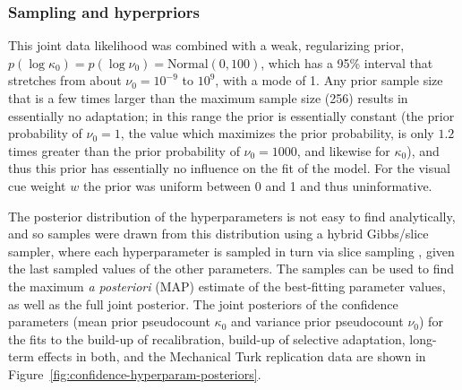 \subsubsection{Sampling and hyperpriors}
\label{sec:sampl-hyperp-priors}

This joint data likelihood was combined with a weak, regularizing prior, $p(\log \kappa_0) = p(\log \nu_0) = \mathrm{Normal}(0, 100)$, which has a 95\% interval that stretches from about $\nu_0=10^{-9}$ to $10^{9}$, with a mode of 1.  Any prior sample size that is a few times larger than the maximum sample size (256) results in essentially no adaptation; in this range the prior is essentially constant (the prior probability of $\nu_0 = 1$, the value which maximizes the prior probability, is only $1.2$ times greater than the prior probability of $\nu_0=1000$, and likewise for $\kappa_0$), and thus this prior has essentially no influence on the fit of the model.  For the visual cue weight $w$ the prior was uniform between 0 and 1 and thus uninformative.

The posterior distribution of the hyperparameters is not easy to find analytically, and so samples were drawn from this distribution using a hybrid Gibbs/slice sampler, where each hyperparameter is sampled in turn via slice sampling \autocite{Neal2003}, given the last sampled values of the other parameters.  The samples can be used to find the maximum \emph{a posteriori} (MAP) estimate of the best-fitting parameter values, as well as the full joint posterior.  The joint posteriors of the confidence parameters (mean prior pseudocount $\kappa_0$ and variance prior pseudocount $\nu_0$) for the fits to the build-up of recalibration, build-up of selective adaptation, long-term effects in both, and the Mechanical Turk replication data are shown in Figure~\ref{fig:confidence-hyperparam-posteriors}.

